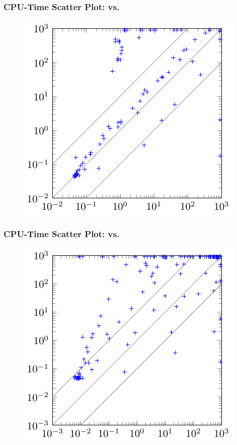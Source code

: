     \begin{frame}
        \frametitle{CPU-Time Scatter Plot: \erssat vs. \erssatb}
        \begin{figure}
            \centering
            \includegraphics{fig/exist-random-ssat/scatter-erssat.pdf}
        \end{figure}
    \end{frame}

    \begin{frame}
        \frametitle{CPU-Time Scatter Plot: \erssat vs. \dcssat}
        \begin{figure}
            \centering
            \includegraphics{fig/exist-random-ssat/scatter-dcssat.pdf}
        \end{figure}
    \end{frame}
\fi